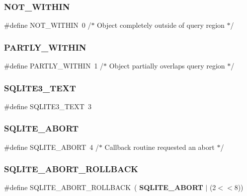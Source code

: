\mbox{\label{sqlite3_8h_ab75eab005da58a1feb4f72a49f94bd6c}} 
\subsubsection{NOT\_WITHIN}
{\footnotesize\ttfamily \#define N\+O\+T\+\_\+\+W\+I\+T\+H\+IN~0   /$\ast$ Object completely outside of query region $\ast$/}

\mbox{\label{sqlite3_8h_a69e88c135c36e97d516298b1ebbbd9c8}} 
\subsubsection{PARTLY\_WITHIN}
{\footnotesize\ttfamily \#define P\+A\+R\+T\+L\+Y\+\_\+\+W\+I\+T\+H\+IN~1   /$\ast$ Object partially overlaps query region $\ast$/}

\mbox{\label{sqlite3_8h_a59970f08c16b9b2bc4831de1565b810b}} 
\subsubsection{SQLITE3\_TEXT}
{\footnotesize\ttfamily \#define S\+Q\+L\+I\+T\+E3\+\_\+\+T\+E\+XT~3}

\mbox{\label{sqlite3_8h_ab0c18279e950b695575a4667c7bb38b7}} 
\subsubsection{SQLITE\_ABORT}
{\footnotesize\ttfamily \#define S\+Q\+L\+I\+T\+E\+\_\+\+A\+B\+O\+RT~4   /$\ast$ Callback routine requested an abort $\ast$/}

\mbox{\label{sqlite3_8h_a02e1aefab597092332b76b1ffc1db018}} 
\subsubsection{SQLITE\_ABORT\_ROLLBACK}
{\footnotesize\ttfamily \#define S\+Q\+L\+I\+T\+E\+\_\+\+A\+B\+O\+R\+T\+\_\+\+R\+O\+L\+L\+B\+A\+CK~(\textbf{ S\+Q\+L\+I\+T\+E\+\_\+\+A\+B\+O\+RT} $\vert$ (2$<$$<$8))}

